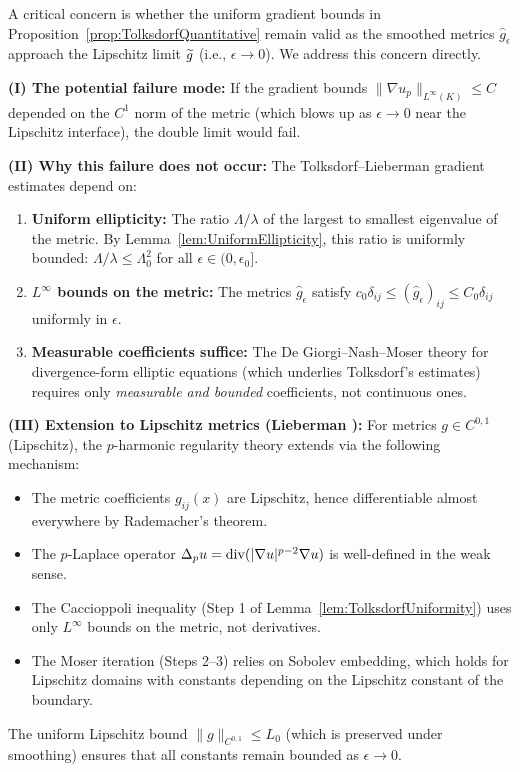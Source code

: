 \begin{remark}\label{rem:GradientBoundsRobustness}
A critical concern is whether the uniform gradient bounds in Proposition~\ref{prop:TolksdorfQuantitative} remain valid as the smoothed metrics $\hat{g}_\epsilon$ approach the Lipschitz limit $\widetilde{g}$ (i.e., $\epsilon \to 0$). We address this concern directly.

\textbf{(I) The potential failure mode:} If the gradient bounds $\|\nabla u_p\|_{L^\infty(K)} \le C$ depended on the $C^1$ norm of the metric (which blows up as $\epsilon \to 0$ near the Lipschitz interface), the double limit would fail.

\textbf{(II) Why this failure does not occur:} The Tolksdorf--Lieberman gradient estimates depend on:
\begin{enumerate}
    \item \textbf{Uniform ellipticity:} The ratio $\Lambda/\lambda$ of the largest to smallest eigenvalue of the metric. By Lemma~\ref{lem:UniformEllipticity}, this ratio is uniformly bounded: $\Lambda/\lambda \le \Lambda_0^2$ for all $\epsilon \in (0, \epsilon_0]$.
    \item \textbf{$L^\infty$ bounds on the metric:} The metrics $\hat{g}_\epsilon$ satisfy $c_0 \delta_{ij} \le (\hat{g}_\epsilon)_{ij} \le C_0 \delta_{ij}$ uniformly in $\epsilon$.
    \item \textbf{Measurable coefficients suffice:} The De Giorgi--Nash--Moser theory for divergence-form elliptic equations (which underlies Tolksdorf's estimates) requires only \emph{measurable and bounded} coefficients, not continuous ones.
\end{enumerate}

\textbf{(III) Extension to Lipschitz metrics (Lieberman \cite{lieberman1988}):} For metrics $g \in C^{0,1}$ (Lipschitz), the $p$-harmonic regularity theory extends via the following mechanism:
\begin{itemize}
    \item The metric coefficients $g_{ij}(x)$ are Lipschitz, hence differentiable almost everywhere by Rademacher's theorem.
    \item The $p$-Laplace operator $\Delta_p u = \mathrm{div}(|\nabla u|^{p-2}\nabla u)$ is well-defined in the weak sense.
    \item The Caccioppoli inequality (Step 1 of Lemma~\ref{lem:TolksdorfUniformity}) uses only $L^\infty$ bounds on the metric, not derivatives.
    \item The Moser iteration (Steps 2--3) relies on Sobolev embedding, which holds for Lipschitz domains with constants depending on the Lipschitz constant of the boundary.
\end{itemize}
The uniform Lipschitz bound $\|g\|_{C^{0,1}} \le L_0$ (which is preserved under smoothing) ensures that all constants remain bounded as $\epsilon \to 0$.


\end{remark}
